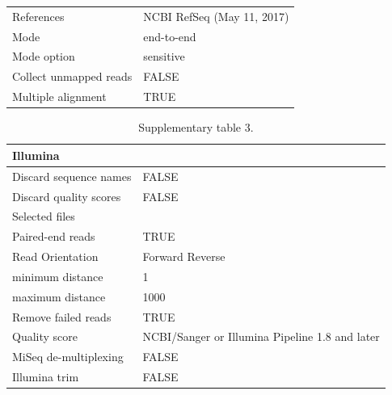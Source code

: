 \begin{table}[]
{\begin{tabular}{ll}
References                                         & NCBI RefSeq (May 11, 2017)         \\
Mode                                               & end-to-end                         \\
Mode option                                        & sensitive                          \\
Collect unmapped reads                             & FALSE                              \\
Multiple alignment                                 & TRUE                              
\end{tabular}%
}
\end{table}

\newpage

\begin{longtable}{ll}
\caption{Supplementary table 3.}
\label{tab:ch2_suptable3}\\
\multicolumn{2}{l}{Illumina}                                                                  \\
\endfirsthead
%
\endhead
%
Discard sequence names                       & FALSE                                          \\
Discard quality scores                       & FALSE                                          \\
Selected files                               &                                                \\
Paired-end reads                             & TRUE                                           \\
Read Orientation                             & Forward Reverse                                \\
minimum distance                             & 1                                              \\
maximum distance                             & 1000                                           \\
Remove failed reads                          & TRUE                                           \\
Quality score                                & NCBI/Sanger or Illumina Pipeline 1.8 and later \\
MiSeq de-multiplexing                        & FALSE                                          \\
Illumina trim                                & FALSE                                          \\

\end{longtable}
